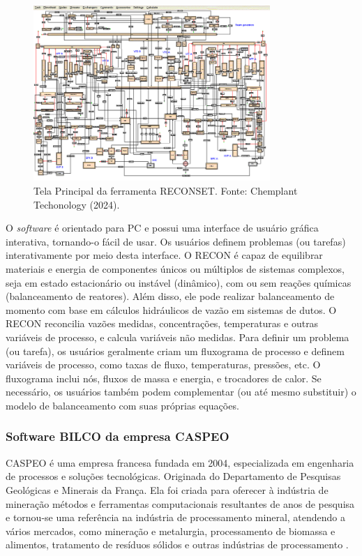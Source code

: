 \begin{figure}[htbp!]
	\centering
	\includegraphics[width=0.8\textwidth]{figuras/recon-chemplay.png}
	\caption{Tela Principal da ferramenta RECONSET. Fonte: Chemplant Techonology (2024).}
	\label{fig:RECONSET}
\end{figure}

O \textit{software} é orientado para PC e possui uma interface de usuário gráfica interativa, tornando-o fácil de usar. Os usuários definem problemas (ou tarefas) interativamente por meio desta interface. O RECON é capaz de equilibrar materiais e energia de componentes únicos ou múltiplos de sistemas complexos, seja em estado estacionário ou instável (dinâmico), com ou sem reações químicas (balanceamento de reatores). Além disso, ele pode realizar balanceamento de momento com base em cálculos hidráulicos de vazão em sistemas de dutos. O RECON reconcilia vazões medidas, concentrações, temperaturas e outras variáveis de processo, e calcula variáveis não medidas. Para definir um problema (ou tarefa), os usuários geralmente criam um fluxograma de processo e definem variáveis de processo, como taxas de fluxo, temperaturas, pressões, etc. O fluxograma inclui nós, fluxos de massa e energia, e trocadores de calor. Se necessário, os usuários também podem complementar (ou até mesmo substituir) o modelo de balanceamento com suas próprias equações.

\subsubsection{Software BILCO da empresa CASPEO}

CASPEO é uma empresa francesa fundada em 2004, especializada em engenharia de processos e soluções tecnológicas. Originada do Departamento de Pesquisas Geológicas e Minerais da França. Ela foi criada para oferecer à indústria de mineração métodos e ferramentas computacionais resultantes de anos de pesquisa e tornou-se uma referência na indústria de processamento mineral, atendendo a vários mercados, como mineração e metalurgia, processamento de biomassa e alimentos, tratamento de resíduos sólidos e outras indústrias de processamento \cite{bilco}.

